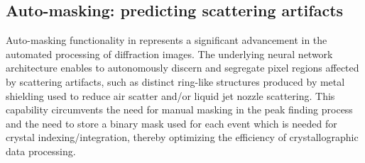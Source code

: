 \documentclass[a4paper]{article}
\begin{document}
\begin{table}
\caption{Comparison of merging statistics between \peaknet{} and fine-tuned \psocake{}.  Thaumatin (TH) results were
merged from run 31, 32, 33, 34 and 36. Proteinase (PK) results were merged from run
37 and 38.}
\label{tb : merge}
\centering
{}
\end{table}


\subsection{Auto-masking: predicting scattering artifacts}

Auto-masking functionality in \peaknet{} represents a significant advancement in the automated processing of diffraction images.  The underlying neural network architecture enables \peaknet{} to autonomously discern and segregate pixel regions affected by scattering artifacts, such as distinct ring-like structures produced by metal shielding used to reduce air scatter and/or liquid jet nozzle scattering.  This capability circumvents the need for manual masking in the peak finding process and the need to store a binary mask used for each event which is needed for crystal indexing/integration, thereby optimizing the efficiency of crystallographic data processing.
\end{document}
